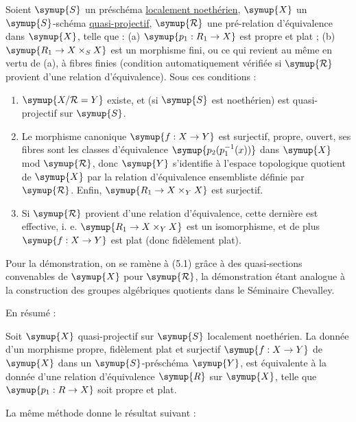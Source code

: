 Soient $\symup{S}$ un préschéma \uline{localement noethérien}, $\symup{X}$
un $\symup{S}$-schéma \uline{quasi-projectif}, $\symup{\mathcal R}$ une pré-relation d'équivalence dans $\symup{X}$,
telle que :
(a) $\symup{p_1:R_1\to X}$ est propre et plat ; (b) $\symup{R_1\to X\times_S X}$ est un morphisme fini, ou ce qui revient au
même en vertu de (a), à fibres finies (condition automatiquement vérifiée si
$\symup{\mathcal R}$ provient d'une relation d'équivalence). Sous ces conditions :
\begin{enumerate}
\item[(i)] $\symup{X/\mathcal R=Y}$ existe, et (si $\symup{S}$ est noethérien) est quasi-projectif sur $\symup{S}$.

\item[(ii)] Le morphisme canonique $\symup{f:X\to Y}$ est surjectif, propre, ouvert,
ses fibres sont les classes d'équivalence $\symup{p_2(p_1^{-1}(x))}$ dans $\symup{X}$ mod $\symup{\mathcal R}$,
donc $\symup{Y}$ s'identifie à l'espace topologique quotient de $\symup{X}$ par la relation
d'équivalence ensembliste définie par $\symup{\mathcal R}$. Enfin,
$\symup{R_1\to X\times_Y X}$ est surjectif.

\item[(iii)] Si $\symup{\mathcal R}$ provient d'une relation d'équivalence, cette dernière est
effective, i. e. $\symup{R_1\to X\times_Y X}$ est un isomorphisme, et de plus
$\symup{f:X\to Y}$ est plat (donc fidèlement plat).
\end{enumerate}

Pour la démonstration, on se ramène à (5.1) grâce à des quasi-sections
convenables de $\symup{X}$ pour $\symup{\mathcal R}$, la démonstration étant analogue à la construction
des groupes algébriques quotients dans le Séminaire Chevalley.

En résumé :

 Soit $\symup{X}$ quasi-projectif sur $\symup{S}$ localement noethérien. La
donnée d'un morphisme propre, fidèlement plat et surjectif $\symup{f:X\to Y}$ de $\symup{X}$
dans un $\symup{S}$-préschéma $\symup{Y}$, est équivalente à la donnée d'une relation
d'équivalence $\symup{R}$ sur $\symup{X}$, telle que $\symup{p_1:R\to X}$ soit propre et plat.

La même méthode donne le résultat suivant :

